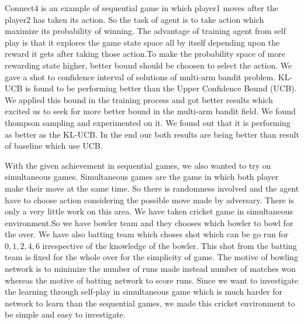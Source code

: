 Connect4 is an example of sequential game in which player1 moves after the player2 has taken its action. So the task of agent is to take action which maximize its probability of winning. The advantage of training agent from self play is that it explores the game state space all by itself depending upon the reward it gets after taking those action.To make the probability space of more rewarding state higher, better bound should be choosen to select the action. We gave a shot to confidence interval of solutions of multi-arm bandit problem. KL-UCB \cite{klucb} is found to be performing better than the Upper Confidence Bound (UCB). We applied this bound in the training process and got better results which excited us to seek for more better bound in the multi-arm bandit field. We found thompson sampling and experimented on it. We found out that it is performing as better as the KL-UCB. In the end our both results are being better than result of baseline which use UCB.

With the given achievement in sequential games, we also wanted to try on simultaneous games.
Simultaneous games are the game in which both player make their move at the same time. So there is randomness involved and the agent have to choose action considering the possible move made by adversary. There is only a very little work on this area. We have taken cricket game in simultaneous environment.So we have bowler team and they chooses which bowler to bowl for the over. We have also batting team which choses shot which can be go run for $0, 1, 2, 4, 6$ irrespective of the knowledge of the bowler. This shot from the batting team is fixed for the whole over for the simplicity of game. The motive of bowling network is to minimize the number of runs made instead number of matches won whereas the motive of batting network to score runs. Since we want to investigate the learning through self-play in simultaneous game which is much harder for network to learn than the sequential games, we made this cricket environment to be simple and easy to investigate. 
